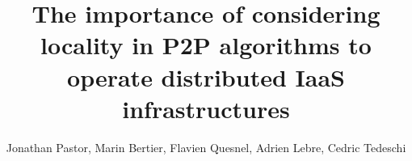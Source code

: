 \documentclass[runningheads,a4paper]{llncs2e/llncs}
\begin{document}
\mainmatter  %

\title{The importance of considering locality in P2P algorithms to operate distributed IaaS infrastructures}


%
%
\author{Jonathan Pastor, Marin Bertier, Flavien Quesnel, Adrien Lebre, Cedric Tedeschi}
%


\maketitle















%
%
%
%
%
%
%

%
%

%
\end{document}
